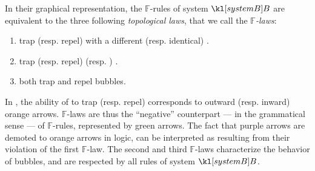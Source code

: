 \begin{description}
  In their graphical representation, the  $\mathbb{F}$-rules of
  system $\sysB$ are equivalent to the three following \emph{topological laws},
  that we call the \emph{$\mathbb{F}$-laws}:
  \begin{fact}
    \sbr
    \begin{enumerate}
      \item {}  trap (resp. repel)  with a different (resp.
      identical) .
      \item {}  trap (resp. repel)  (resp. ) .
      \item {}  both trap and repel  bubbles.
    \end{enumerate}
  \end{fact}
  In , the ability of  to trap (resp. repel)
   corresponds to outward (resp. inward) orange arrows. $\mathbb{F}$-laws
  are thus the ``negative'' counterpart --- in the grammatical sense --- of
  $\mathbb{F}$-rules, represented by green arrows. The fact that purple arrows
  are demoted to orange arrows in  logic, can be interpreted as
  resulting from their violation of the first $\mathbb{F}$-law. The second and
  third $\mathbb{F}$-laws characterize the behavior of  bubbles, and are
  respected by all rules of system $\sysB$.
  

\end{description}
